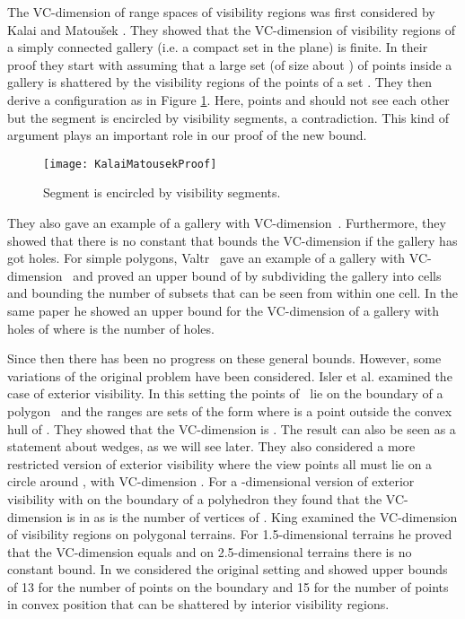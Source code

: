\documentclass[11pt]{article}
\begin{document}
The VC-dimension of range spaces of visibility regions was first considered by Kalai and Matou\v sek \cite{km-ggwep-97}.
They showed that the VC-dimension of visibility regions of a simply connected gallery (i.e. a compact set in the plane) is finite.
In their proof they start with assuming that a large set (of size about ) of points  inside a gallery is shattered by the visibility regions of the points of a set . They then derive a configuration as in Figure \ref{KalaiMatousekProof-fig}. Here, points  and  should not see each other but the segment  is encircled by visibility segments, a contradiction. This kind of argument plays an important role in our proof of the new bound.
\begin{figure}[hbtp]\begin{center}\texttt{[image: KalaiMatousekProof]}\caption{Segment  is encircled by visibility segments.}\label{KalaiMatousekProof-fig}
  \end{center}\end{figure}
They also gave an example of a gallery with VC-dimension~. Furthermore, they showed that there is no constant that bounds the VC-dimension
if the gallery has got holes.  
For simple polygons, Valtr~\cite{v-ggwps-98} gave an example of a gallery with VC-dimension~ and proved an upper bound of  by subdividing the gallery into
cells and bounding the number of subsets that can be seen from within one cell. In the same paper he showed an upper bound for the VC-dimension of a 
gallery with holes of  where  is the number of holes.

Since then there has been no progress on these general bounds. However, some variations of the original problem have been considered.
Isler et al. \cite{ikdv-vcdev-04} examined the case of exterior visibility. In this setting the points of~ lie on the boundary of a polygon~
and the ranges are sets of the form  where  is a point outside the convex hull of . They showed that the VC-dimension is .
The result can also be seen as a statement about wedges, as we will see later.
They also considered a more restricted version of exterior visibility where the view points  all must lie on a circle around , 
with VC-dimension . For a -dimensional version of exterior visibility with  on the boundary of a polyhedron  they found that the
VC-dimension is in  as  is the number of vertices of .
King \cite{k-vcdvt-08} examined the VC-dimension of visibility regions on polygonal terrains. 
For 1.5-dimensional terrains he proved that the VC-dimension equals  and on 2.5-dimensional terrains there is no constant bound.
In \cite{gk-nrvsp-09} we considered the original setting and showed upper bounds of 13 for the number of points on the boundary and 15 for the number of points in convex position that can be shattered by interior visibility regions.
\end{document}
